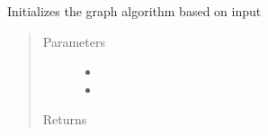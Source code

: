 \documentclass[letterpaper,10pt,english]{sphinxmanual}
\begin{document}
\begin{fulllineitems}
\label{\detokenize{ppopt.mp_solvers:ppopt.mp_solvers.mpqp_graph.graph_initialization}}
\sphinxAtStartPar
Initializes the graph algorithm based on input
\begin{quote}\begin{description}
\item[{Parameters}] \leavevmode\begin{itemize}
\item {} 
\sphinxAtStartPar
{} \textendash{} 

\item {} 
\sphinxAtStartPar
{} \textendash{} 

\end{itemize}

\item[{Returns}] \leavevmode
\sphinxAtStartPar


\end{description}\end{quote}

\end{fulllineitems}

\end{document}
